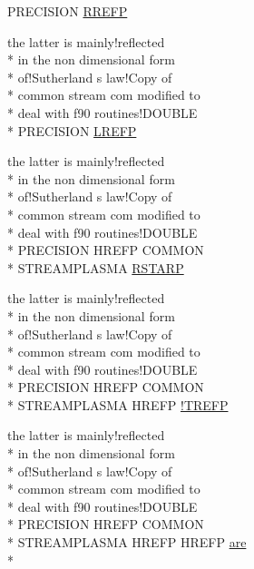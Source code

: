 \begin{DoxyCompactItemize}
P\-R\-E\-C\-I\-S\-I\-O\-N \hyperlink{streamplasma_8com_adb75412f07c57a9251dabfcc07e20c30}{R\-R\-E\-F\-P}
\item 
the latter is mainly!reflected \\*
in the non dimensional form \\*
of!\-Sutherland s law!\-Copy of \\*
common stream com modified to \\*
deal with f90 routines!\-D\-O\-U\-B\-L\-E \\*
P\-R\-E\-C\-I\-S\-I\-O\-N \hyperlink{streamplasma_8com_a2615938ffd6bf7e79a790aca064ad765}{L\-R\-E\-F\-P}
\item 
the latter is mainly!reflected \\*
in the non dimensional form \\*
of!\-Sutherland s law!\-Copy of \\*
common stream com modified to \\*
deal with f90 routines!\-D\-O\-U\-B\-L\-E \\*
P\-R\-E\-C\-I\-S\-I\-O\-N H\-R\-E\-F\-P C\-O\-M\-M\-O\-N \\*
S\-T\-R\-E\-A\-M\-P\-L\-A\-S\-M\-A \hyperlink{streamplasma_8com_adae9419de6845ee8a01c09d17e42e230}{R\-S\-T\-A\-R\-P}
\item 
the latter is mainly!reflected \\*
in the non dimensional form \\*
of!\-Sutherland s law!\-Copy of \\*
common stream com modified to \\*
deal with f90 routines!\-D\-O\-U\-B\-L\-E \\*
P\-R\-E\-C\-I\-S\-I\-O\-N H\-R\-E\-F\-P C\-O\-M\-M\-O\-N \\*
S\-T\-R\-E\-A\-M\-P\-L\-A\-S\-M\-A H\-R\-E\-F\-P \hyperlink{streamplasma_8com_a415470db845b59a967ddf481ad4c7efe}{!\-T\-R\-E\-F\-P}
\item 
the latter is mainly!reflected \\*
in the non dimensional form \\*
of!\-Sutherland s law!\-Copy of \\*
common stream com modified to \\*
deal with f90 routines!\-D\-O\-U\-B\-L\-E \\*
P\-R\-E\-C\-I\-S\-I\-O\-N H\-R\-E\-F\-P C\-O\-M\-M\-O\-N \\*
S\-T\-R\-E\-A\-M\-P\-L\-A\-S\-M\-A H\-R\-E\-F\-P H\-R\-E\-F\-P \hyperlink{ibc8_8com_a7f7721a0bb3c1d35cfbfbcfd6efc1548}{are} \\*

\end{DoxyCompactItemize}
